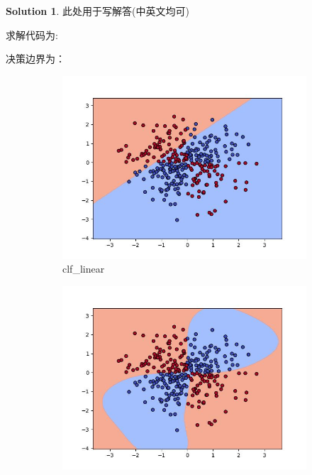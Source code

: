 \documentclass[a4paper,UTF8]{article}
\numberwithin{equation}{section}
\theoremstyle{definition}
\newtheorem*{solution}{Solution}
\begin{document}
\begin{solution}
    此处用于写解答(中英文均可)
    
    求解代码为:
    
    
    决策边界为：
    \begin{figure}[h]
        \centering
        \begin{subfigure}[b]{0.3\textwidth}
            \includegraphics[width=\textwidth]{clf_linear.jpg}
            \caption{clf\_linear}
        \end{subfigure}
        \begin{subfigure}[b]{0.3\textwidth}
            \includegraphics[width=\textwidth]{clf_rbf.jpg}

\end{subfigure}
\end{figure}
\end{solution}
\end{document}
